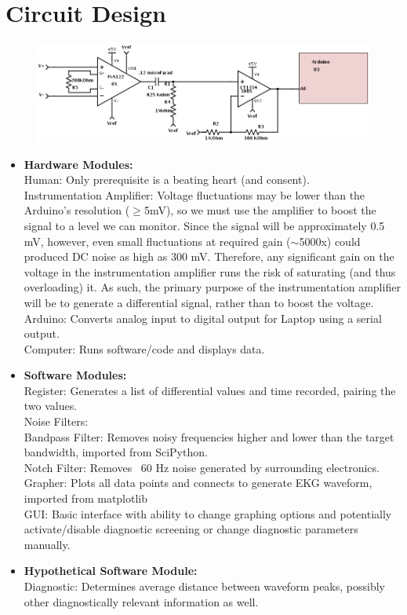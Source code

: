 \documentclass[11pt, oneside]{article}   	%
\begin{document}
\section{Circuit Design}
\begin{figure}[htb!]
\centering
\includegraphics[width=\textwidth]{blockdiagnew}
\end{figure}
\begin{itemize}[leftmargin=*]

\item[] \textbf{Hardware Modules:}\\
	Human: Only prerequisite is a beating heart (and consent).\\
	Instrumentation Amplifier: Voltage fluctuations may be lower than the Arduino's resolution ($\geq$5mV), so we must use the amplifier to boost the signal to a level we can monitor. Since the signal will be approximately 0.5 mV, however, even small fluctuations at required gain ($\sim$5000x) could produced DC noise as high as 300 mV. \cite{karptalk} Therefore, any significant gain on the voltage in the instrumentation amplifier runs the risk of saturating (and thus overloading) it. As such, the primary purpose of the instrumentation amplifier will be to generate a differential signal, rather than to boost the voltage.\\
	Arduino: Converts analog input to digital output for Laptop using a serial output.\\
	Computer: Runs software/code and displays data. 
	
\item[] \textbf{Software Modules:}\\
	Register: Generates a list of differential values and time recorded, pairing the two values.\\
	Noise Filters:\\
		Bandpass Filter: Removes noisy frequencies higher and lower than the target bandwidth, imported from SciPython. \cite{SciPython}\\
		Notch Filter: Removes ~60 Hz noise generated by surrounding electronics.  
	Grapher: Plots all data points and connects to generate EKG waveform, imported from matplotlib\\
	GUI: Basic interface with ability to change graphing options and potentially activate/disable diagnostic screening or change diagnostic parameters manually.\\
	
\item[] \textbf{Hypothetical Software Module:}\\
	Diagnostic: Determines average distance between waveform peaks, possibly other diagnostically relevant information as well.
\end{itemize}
\end{document}
